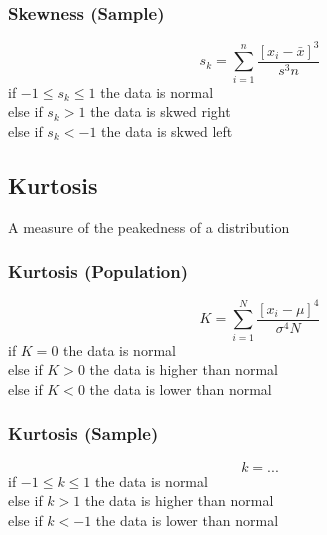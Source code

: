 \documentclass[twocolumn]{article}
\begin{document}
    \subsubsection{Skewness (Sample)}
    \begin{equation}
        s_{k} = \sum_{i=1}^{n}\frac{[x_{i} - \bar{x}]^{3}}{s^{3}n}
    \end{equation}
    if $-1 \leq s_{k} \leq 1$ the data is normal\\
    else if $s_{k} > 1$ the data is skwed right\\
    else if $s_{k} < -1$ the data is skwed left
    \subsection{Kurtosis}
    A measure of the peakedness of a distribution
    \subsubsection{Kurtosis (Population)}
    \begin{equation}
        K = \sum_{i=1}^{N}\frac{[x_{i} - \mu]^{4}}{\sigma^{4}N}
    \end{equation}
    if $K = 0$ the data is normal\\
    else if $K > 0$ the data is higher than normal\\
    else if $K < 0$ the data is lower than normal
    \subsubsection{Kurtosis (Sample)}
    \begin{equation}
        k = ...
    \end{equation}
    if $-1 \leq k \leq 1$ the data is normal\\
    else if $k > 1$ the data is higher than normal\\
    else if $k < -1$ the data is lower than normal
\end{document}
